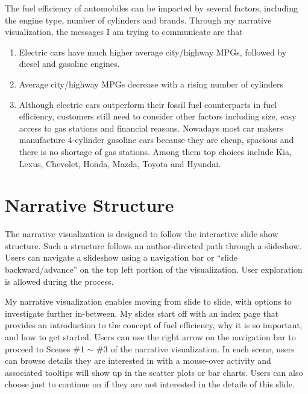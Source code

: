 \documentclass[11pt]{article}
\begin{document}
The fuel efficiency of automobiles can be impacted by several factors, including the engine type, number of cylinders and brands. Through my narrative visualization, the messages I am trying to communicate are that
\begin{enumerate}
	\item Electric cars have much higher average city/highway MPGs, followed by diesel and gasoline engines.
	\item Average city/highway MPGs decrease with a rising number of cylinders
	\item Although electric cars outperform their fossil fuel counterparts in fuel efficiency,  customers still need to consider other factors including size, easy access to gas stations and financial reasons. Nowadays most car makers manufacture 4-cylinder gasoline cars because they are cheap, spacious and there is no shortage of gas stations. Among them top choices include Kia, Lexus, Chevolet, Honda, Mazda, Toyota and Hyundai. 
\end{enumerate}

\section{Narrative Structure}
The narrative visualization is designed to follow the interactive slide show structure. Such a structure follows an author-directed path through a slideshow. Users can navigate a slideshow using a navigation bar or “slide backward/advance” on the top left portion of the visualization. User exploration is allowed during the process.

My narrative visualization enables moving from slide to slide, with options to investigate further in-between. My slides start off with an index page that provides an introduction to the concept of fuel efficiency,  why it is so important, and how to get started. Users can use the right arrow on the navigation bar to proceed to Scenes \#1 $\sim$ \#3  of the narrative visualization. In each scene, users can browse details they are interested in with a mouse-over activity and associated tooltips will show up in the scatter plots or bar charts. Users can also choose just to continue on if they are not interested in the details of this slide. 
\end{document}
